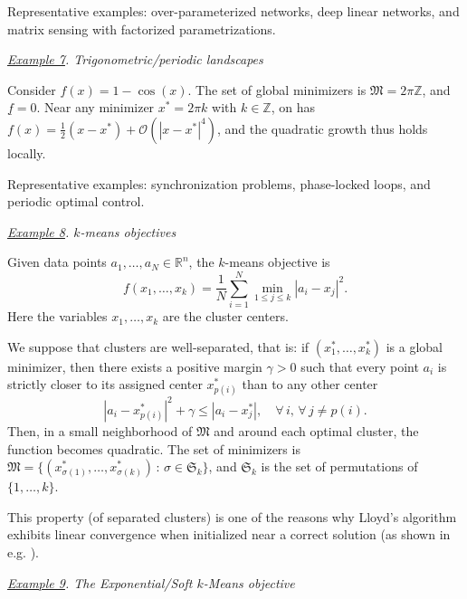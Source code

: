 \documentclass[12pt]{amsart}
\numberwithin{equation}{section}
\theoremstyle{plain}
\begin{document}
Representative examples: over-parameterized networks, deep linear networks, and matrix sensing with factorized parametrizations.



\textbullet\; \textit{\underline{Example 7}. Trigonometric/periodic landscapes}

Consider $f(x) = 1- \cos(x)$. The set of global minimizers is $\mathfrak{M}=2\pi\mathbb{Z}$, and $\underline{f} = 0$. Near any minimizer $x^{*} = 2\pi k$ with $k\in \mathbb{Z}$, on has $f(x) = \frac{1}{2}(x-x^{*}) + \mathcal{O}(|x-x^{*}|^{4})$, and the quadratic growth thus holds locally. 

Representative examples: synchronization problems, phase-locked loops, and periodic optimal control.



\textbullet\; \textit{\underline{Example 8}. $k$-means objectives}

Given data points $a_{1}, \dots, a_{N} \in \mathbb{R}^{n}$, the $k$-means objective is
\begin{equation*}
    f(x_{1},\dots, x_{k}) = \frac{1}{N} \sum\limits_{i=1}^{N} \min\limits_{1\leq j \leq k} |a_{i} - x_{j}|^{2}.
\end{equation*}
Here the variables $x_{1}, \dots, x_{k}$ are the cluster centers. 

We suppose that clusters are well-separated, that is: if $(x_{1}^{*},\dots, x_{k}^{*})$ is a global minimizer, then there exists a positive margin $\gamma>0$ such that every point $a_{i}$ is strictly closer to its assigned center $x_{p(i)}^{*}$ than to any other center
\begin{equation*}
	|a_{i} - x_{p(i)}^{*}|^{2} + \gamma \leq |a_{i} - x^{*}_{j}|, \quad \forall\, i,\, \forall\, j\neq p(i).
\end{equation*}
Then, in a small neighborhood of $\mathfrak{M}$ and around each optimal cluster, the function becomes quadratic. The set of minimizers is $\mathfrak{M} = \{ (x_{\sigma(1)}^{*},\dots, x_{\sigma(k)}^{*}) \,:\, \sigma \in \mathfrak{S}_{k}\}$, and $\mathfrak{S}_{k}$ is the set of permutations of $\{1,\dots, k\}$.

This property (of separated clusters) is one of the reasons why Lloyd’s algorithm \cite{lloyd1982least}  exhibits linear convergence when initialized near a correct solution (as shown in e.g. \cite{lu2016statistical}).




\textbullet\; \textit{\underline{Example 9}. The Exponential/Soft $k$-Means objective}
\end{document}
